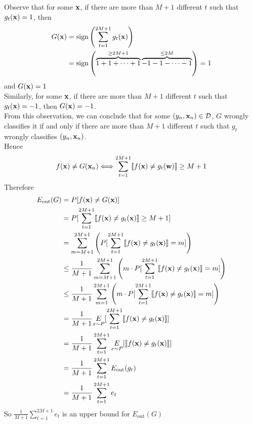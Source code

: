 \documentclass[11pt]{article}
\let\mathbb\relax
\theoremstyle{definition}
\begin{document}
Observe that for some $\vb{x}$, if there are more than $M + 1$ different $t$ such that $g_t(\vb{x}) = 1$, then
\begin{align*}
  G(\vb{x}) &= \text{sign}\left(\sum^{2M + 1}_{t = 1}g_t(\vb{x})\right) \\ 
  &= \text{sign}\left(\overbrace{1 + 1 +\dots + 1}^{\geq 2M + 1}\overbrace{-1 - 1 -\dots - 1}^{\leq 2M}\right) = 1
\end{align*}
and $G(\vb{x}) = 1$ \\ 
Similarly, for some $\vb{x}$, if there are more than $M + 1$ different $t$ such that $g_t(\vb{x}) = -1$, then $G(\vb{x}) = -1$. \\ 
From this observation, we can conclude that for some $(y_n, \vb{x}_n)\in\mathcal{D}$, $G$ wrongly classifies it if and only if there are more than $M + 1$ different $t$ such that $g_t$ wrongly classifies $(y_n, \vb{x}_n)$. \\ 
Hence 
\[
  f(\vb{x}) \neq G(\vb{x}_n) \Longleftrightarrow \sum^{2M + 1}_{t = 1}\llbracket f(\vb{x})\neq g_t(\vb{w})\rrbracket \geq M + 1
\]
Therefore
\begin{align*}
  E_\text{out}(G) &= \mathbb{P}[f(\vb{x})\neq G(\vb{x})] \\ 
  &= \mathbb{P}[\sum^{2M + 1}_{t = 1}\llbracket f(\vb{x})\neq g_t(\vb{x})\rrbracket \geq M + 1] \\ 
  &= \sum^{2M + 1}_{m = M + 1}\left(\mathbb{P}[\sum^{2M + 1}_{t = 1}\llbracket f(\vb{x})\neq g_t(\vb{x})\rrbracket = m]\right) \\
  &\leq \frac{1}{M + 1}\sum^{2M + 1}_{m = M + 1}\left(m\cdot\mathbb{P}[\sum^{2M + 1}_{t = 1}\llbracket f(\vb{x})\neq g_t(\vb{x})\rrbracket = m]\right) \\
  &\leq \frac{1}{M + 1}\sum^{2M + 1}_{m = 1}\left(m\cdot\mathbb{P}[\sum^{2M + 1}_{t = 1}\llbracket f(\vb{x})\neq g_t(\vb{x})\rrbracket = m]\right) \\
  &= \frac{1}{M + 1}\underset{x\sim P}{\mathbb{E}}[\sum^{2M + 1}_{t = 1}\llbracket f(\vb{x})\neq g_t(\vb{x})\rrbracket]\\
  &= \frac{1}{M + 1}\sum^{2M + 1}_{t = 1}\underset{x\sim P}{\mathbb{E}}[\llbracket f(\vb{x})\neq g_t(\vb{x})\rrbracket] \\ 
  &= \frac{1}{M + 1}\sum^{2M + 1}_{t = 1}E_\text{out}(g_t) \\ 
  &= \frac{1}{M + 1}\sum^{2M + 1}_{t = 1}e_t
\end{align*}
So $\frac{1}{M + 1}\sum^{2M + 1}_{t = 1}e_t$ is an upper bound for $E_\text{out}(G)$ \\ 
\end{document}
